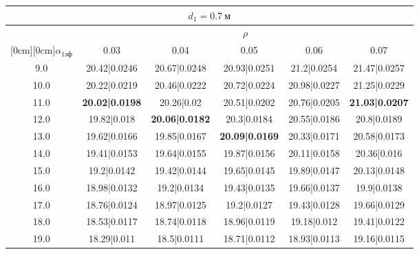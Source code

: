 \documentclass[20pt]{article}
\begin{document}
\begin{center}
\begin{tabular}{c|ccccc}
\hline
	\multicolumn{6}{c}{$d_{1}=0.7 \ м$} \\
\hline
	 & \multicolumn{5}{|c}{$\rho$} \\
	\cline{2-6}
	\raisebox{1.5ex}[0cm][0cm]{$\alpha_{1эф}$} & 0.03 & 0.04 & 0.05 & 0.06 & 0.07\\
\hline
	9.0 & 	20.42|0.0246 & 	20.67|0.0248 & 	20.93|0.0251 & 	21.2|0.0254 & 	21.47|0.0257\\
	10.0 & 	20.22|0.0219 & 	20.46|0.0222 & 	20.72|0.0224 & 	20.98|0.0227 & 	21.25|0.0229\\
	11.0 & 	\textbf{20.02|0.0198} & 	20.26|0.02 & 	20.51|0.0202 & 	20.76|0.0205 & 	\textbf{21.03|0.0207}\\
	12.0 & 	19.82|0.018 & 	\textbf{20.06|0.0182} & 	20.3|0.0184 & 	20.55|0.0186 & 	20.8|0.0189\\
	13.0 & 	19.62|0.0166 & 	19.85|0.0167 & 	\textbf{20.09|0.0169} & 	20.33|0.0171 & 	20.58|0.0173\\
	14.0 & 	19.41|0.0153 & 	19.64|0.0155 & 	19.87|0.0156 & 	20.11|0.0158 & 	20.36|0.016\\
	15.0 & 	19.2|0.0142 & 	19.42|0.0144 & 	19.65|0.0145 & 	19.89|0.0147 & 	20.13|0.0148\\
	16.0 & 	18.98|0.0132 & 	19.2|0.0134 & 	19.43|0.0135 & 	19.66|0.0137 & 	19.9|0.0138\\
	17.0 & 	18.76|0.0124 & 	18.97|0.0125 & 	19.2|0.0127 & 	19.43|0.0128 & 	19.66|0.0129\\
	18.0 & 	18.53|0.0117 & 	18.74|0.0118 & 	18.96|0.0119 & 	19.18|0.012 & 	19.41|0.0122\\
	19.0 & 	18.29|0.011 & 	18.5|0.0111 & 	18.71|0.0112 & 	18.93|0.0113 & 	19.16|0.0115\\
\end{tabular}


\end{center}
\end{document}
